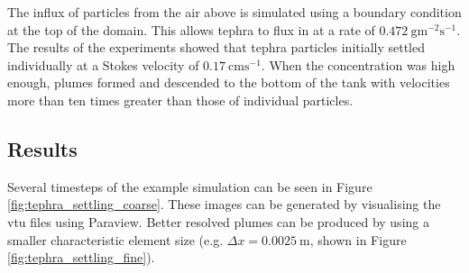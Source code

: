 The influx of particles from the air above is simulated using a  boundary condition at the top of the domain. This allows tephra to flux in at a rate of $0.472\ \mathrm{gm^{-2}s^{-1}}$. The results of the experiments showed that tephra particles initially settled individually at a Stokes velocity of $0.17\ \mathrm{cms^{-1}}$. When the concentration was high enough, plumes formed and descended to the bottom of the tank with velocities more than ten times greater than those of individual particles.

\subsection{Results}
Several timesteps of the example simulation can be seen in Figure \ref{fig:tephra_settling_coarse}. These images can be generated by visualising the vtu files using Paraview. Better resolved plumes can be produced by using a smaller characteristic element size (e.g. $\Delta x = 0.0025\ \mathrm{m}$, shown in Figure \ref{fig:tephra_settling_fine}).

